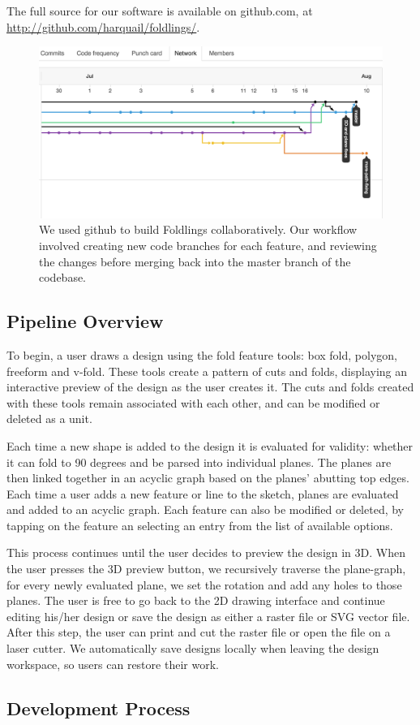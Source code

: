 The full source for our software is available on github.com, at
\url{http://github.com/harquail/foldlings/}.

\begin{figure}[htbp]
\centering
\includegraphics{figures/30_UI_Design_Philosophy/gitflow.png}
\caption{We used github to build Foldlings collaboratively. Our workflow
involved creating new code branches for each feature, and reviewing the
changes before merging back into the master branch of the codebase.}
\end{figure}

\subsection{Pipeline Overview}\label{pipeline-overview}

To begin, a user draws a design using the fold feature tools: box fold,
polygon, freeform and v-fold. These tools create a pattern of cuts and
folds, displaying an interactive preview of the design as the user
creates it. The cuts and folds created with these tools remain
associated with each other, and can be modified or deleted as a unit.

Each time a new shape is added to the design it is evaluated for
validity: whether it can fold to 90 degrees and be parsed into
individual planes. The planes are then linked together in an acyclic
graph based on the planes' abutting top edges. Each time a user adds a
new feature or line to the sketch, planes are evaluated and added to an
acyclic graph. Each feature can also be modified or deleted, by tapping
on the feature an selecting an entry from the list of available options.

This process continues until the user decides to preview the design in
3D. When the user presses the 3D preview button, we recursively traverse
the plane-graph, for every newly evaluated plane, we set the rotation
and add any holes to those planes. The user is free to go back to the 2D
drawing interface and continue editing his/her design or save the design
as either a raster file or SVG vector file. After this step, the user
can print and cut the raster file or open the file on a laser cutter. We
automatically save designs locally when leaving the design workspace, so
users can restore their work.

\subsection{Development Process}\label{development-process}
